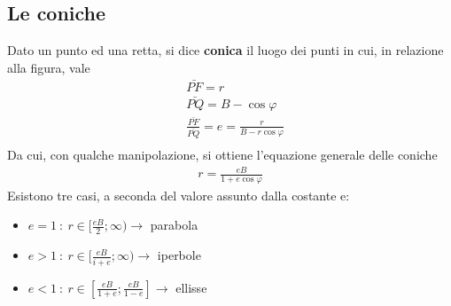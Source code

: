 \documentclass[10pt,a4paper]{article}
\begin{document}
\subsection{Le coniche}\label{app:coniche}
Dato un punto ed una retta, si dice \textbf{conica} il luogo dei punti in cui, in relazione alla figura, vale
\begin{align*}
&\bar{PF} = r\\
&\bar{PQ} = B - \cos\varphi\\
&\frac{\bar{PF}}{\bar{PQ}} = e = \frac{r}{B - r \cos\varphi}\\
\end{align*}
Da cui, con qualche manipolazione, si ottiene l'equazione generale delle coniche
\begin{align*}
	r = \frac{eB}{1+e\cos\varphi}
\end{align*}
Esistono tre casi, a seconda del valore assunto dalla costante e:
\begin{itemize}
	\item $e = 1\ :\  r \in [ \frac{e B}{2}; \infty ) \rightarrow$ parabola
	\item $e > 1\ :\ r \in [ \frac{e B}{i+e}; \infty ) \rightarrow$ iperbole
	\item $e < 1 \ : \ r \in [ \frac{e B}{1 + e}; \frac{e B}{1 - e} ] \rightarrow$ ellisse
\end{itemize}
\end{document}
